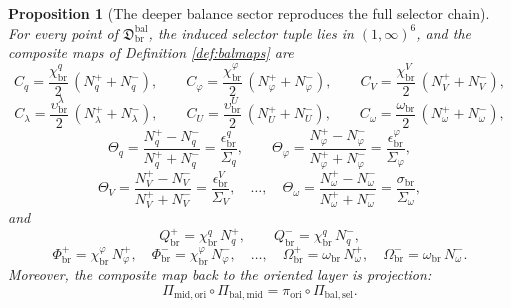 \documentclass[11pt]{article}
\newcommand{\AbsReadAmp}{\chi_{\mathrm{br}}^{q}}
\newcommand{\AbsCovAmp}{\chi_{\mathrm{br}}^{\varphi}}
\newcommand{\AbsRelaxAmp}{\chi_{\mathrm{br}}^{V}}
\newcommand{\AbsWellAmp}{\upsilon_{\mathrm{br}}^{\lambda}}
\newcommand{\AbsEqAmp}{\upsilon_{\mathrm{br}}^{U}}
\newcommand{\AbsScaleAmp}{\omega_{\mathrm{br}}}
\newcommand{\PolRead}{\epsilon_{\mathrm{br}}^{q}}
\newcommand{\PolCov}{\epsilon_{\mathrm{br}}^{\varphi}}
\newcommand{\PolRelax}{\epsilon_{\mathrm{br}}^{V}}
\newcommand{\PolScale}{\sigma_{\mathrm{br}}}
\newcommand{\PairReadPlus}{Q_{\mathrm{br}}^{+}}
\newcommand{\PairReadMinus}{Q_{\mathrm{br}}^{-}}
\newcommand{\PairCovPlus}{\Phi_{\mathrm{br}}^{+}}
\newcommand{\PairCovMinus}{\Phi_{\mathrm{br}}^{-}}
\newcommand{\PairScalePlus}{\Omega_{\mathrm{br}}^{+}}
\newcommand{\PairScaleMinus}{\Omega_{\mathrm{br}}^{-}}
\newcommand{\MidOriginMap}{\Pi_{\mathrm{mid,ori}}}
\newcommand{\MidRead}{C_{q}}
\newcommand{\MidCov}{C_{\varphi}}
\newcommand{\MidRelax}{C_{V}}
\newcommand{\MidWell}{C_{\lambda}}
\newcommand{\MidEq}{C_{U}}
\newcommand{\MidScale}{C_{\omega}}
\newcommand{\FiberRead}{\Theta_{q}}
\newcommand{\FiberCov}{\Theta_{\varphi}}
\newcommand{\FiberRelax}{\Theta_{V}}
\newcommand{\FiberScale}{\Theta_{\omega}}
\newcommand{\SelProj}{\pi_{\mathrm{ori}}}
\newcommand{\SelRead}{\Sigma_{q}}
\newcommand{\SelCov}{\Sigma_{\varphi}}
\newcommand{\SelRelax}{\Sigma_{V}}
\newcommand{\SelScale}{\Sigma_{\omega}}
\newcommand{\MidBalanceSector}{\mathfrak D_{\mathrm{br}}^{\mathrm{bal}}}
\newcommand{\BalSelMap}{\Pi_{\mathrm{bal,sel}}}
\newcommand{\BalMidMap}{\Pi_{\mathrm{bal,mid}}}
\newcommand{\BalReadPlus}{N_{q}^{+}}
\newcommand{\BalReadMinus}{N_{q}^{-}}
\newcommand{\BalCovPlus}{N_{\varphi}^{+}}
\newcommand{\BalCovMinus}{N_{\varphi}^{-}}
\newcommand{\BalRelaxPlus}{N_{V}^{+}}
\newcommand{\BalRelaxMinus}{N_{V}^{-}}
\newcommand{\BalWellPlus}{N_{\lambda}^{+}}
\newcommand{\BalWellMinus}{N_{\lambda}^{-}}
\newcommand{\BalEqPlus}{N_{U}^{+}}
\newcommand{\BalEqMinus}{N_{U}^{-}}
\newcommand{\BalScalePlus}{N_{\omega}^{+}}
\newcommand{\BalScaleMinus}{N_{\omega}^{-}}
\newtheorem{proposition}{Proposition}
\begin{document}
\begin{proposition}[The deeper balance sector reproduces the full selector chain]
\label{prop:balchain}
For every point of \(\MidBalanceSector\), the induced selector tuple lies in \((1,\infty)^{6}\), and the composite maps of Definition \ref{def:balmaps} are
\begin{equation}
\MidRead=\frac{\AbsReadAmp}{2}\,(\BalReadPlus+\BalReadMinus),
\qquad
\MidCov=\frac{\AbsCovAmp}{2}\,(\BalCovPlus+\BalCovMinus),
\qquad
\MidRelax=\frac{\AbsRelaxAmp}{2}\,(\BalRelaxPlus+\BalRelaxMinus),
\label{eq:balmidA}
\end{equation}
\begin{equation}
\MidWell=\frac{\AbsWellAmp}{2}\,(\BalWellPlus+\BalWellMinus),
\qquad
\MidEq=\frac{\AbsEqAmp}{2}\,(\BalEqPlus+\BalEqMinus),
\qquad
\MidScale=\frac{\AbsScaleAmp}{2}\,(\BalScalePlus+\BalScaleMinus),
\label{eq:balmidB}
\end{equation}
\begin{equation}
\FiberRead
=
\frac{\BalReadPlus-\BalReadMinus}{\BalReadPlus+\BalReadMinus}
=
\frac{\PolRead}{\SelRead},
\qquad
\FiberCov
=
\frac{\BalCovPlus-\BalCovMinus}{\BalCovPlus+\BalCovMinus}
=
\frac{\PolCov}{\SelCov},
\label{eq:balfiberA}
\end{equation}
\begin{equation}
\FiberRelax
=
\frac{\BalRelaxPlus-\BalRelaxMinus}{\BalRelaxPlus+\BalRelaxMinus}
=
\frac{\PolRelax}{\SelRelax},
\quad
\ldots,
\quad
\FiberScale
=
\frac{\BalScalePlus-\BalScaleMinus}{\BalScalePlus+\BalScaleMinus}
=
\frac{\PolScale}{\SelScale},
\label{eq:balfiberB}
\end{equation}
and
\begin{equation}
\PairReadPlus=\AbsReadAmp\,\BalReadPlus,
\qquad
\PairReadMinus=\AbsReadAmp\,\BalReadMinus,
\label{eq:balpairA}
\end{equation}
\begin{equation}
\PairCovPlus=\AbsCovAmp\,\BalCovPlus,
\quad
\PairCovMinus=\AbsCovAmp\,\BalCovMinus,
\quad
\ldots,
\quad
\PairScalePlus=\AbsScaleAmp\,\BalScalePlus,
\quad
\PairScaleMinus=\AbsScaleAmp\,\BalScaleMinus.
\label{eq:balpairB}
\end{equation}
Moreover, the composite map back to the oriented layer is projection:
\begin{equation}
\MidOriginMap\circ\BalMidMap=\SelProj\circ\BalSelMap.
\label{eq:balorigin}
\end{equation}
\end{proposition}
\end{document}
